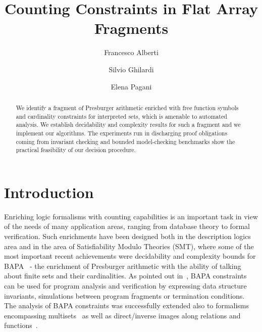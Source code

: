 \documentclass[11pt,a4paper]{article}
\title{Counting Constraints in Flat Array Fragments}
\author[1]{Francesco Alberti}
\author[2]{Silvio Ghilardi}
\author[2]{Elena Pagani}
\affil[1]{ Fondazione S. Raffaele, Milano, Italy}
\affil[2]{Universit\`a degli Studi di Milano, Milano, Italy}
\begin{document}
\maketitle              \setcounter{footnote}{0}

\begin{abstract}
We identify a fragment of Presburger arithmetic enriched with free function symbols and cardinality constraints for interpreted sets, which is amenable to automated analysis. We establish decidability and complexity results for such a fragment and
we implement our algorithms. The experiments run in discharging proof obligations
coming from invariant checking and bounded model-checking benchmarks
show the practical feasibility of our decision procedure.
\end{abstract}


\section{Introduction} 

Enriching logic formalisms with counting capabilities is an important task in view of the needs of many application areas, ranging from database theory to formal verification. 
Such enrichments have been designed both in the description logics area and in the area of Satisfiability Modulo Theories (SMT), where some of the most important recent achievements 
were decidability
and  complexity bounds for BAPA~\cite{KunkakCADE20} - the enrichment of Presburger arithmetic with the ability of talking about finite sets and their cardinalities. 
As pointed out in~\cite{KunkakJAR}, BAPA constraints can be used for program analysis and verification by expressing data structure invariants, simulations between program fragments or termination conditions.
The analysis of BAPA constraints was successfully extended also to formalisms encompassing multisets~\cite{KunkakVMCAI08} as well as direct/inverse images 
along relations and functions~\cite{KunkakVMCAI10}.
\end{document}
